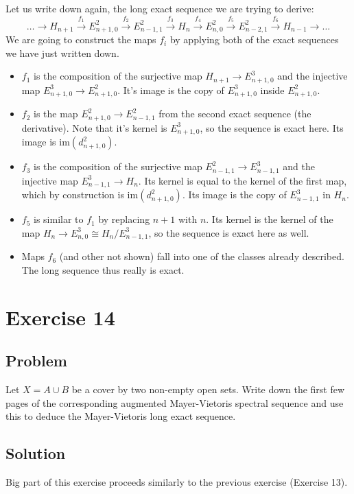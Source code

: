 \documentclass{article}
\begin{document}
Let us write down again, the long exact sequence we are trying to derive:
\begin{equation*}
\dots \to H_{n+1} \xrightarrow{f_1} E^2_{n+1,0} \xrightarrow{f_2}  E^2_{n-1,1} \xrightarrow{f_3}  H_n \xrightarrow{f_4}  E^2_{n,0} \xrightarrow{f_5}  E^2_{n-2,1} \xrightarrow{f_6}  H_{n-1} \to \dots
\end{equation*}
We are going to construct the maps $f_i$ by applying both of the exact sequences we have just written down.
\begin{itemize}
\item $f_1$ is the composition of the surjective map $H_{n+1} \to E_{n+1,0}^3$ and the injective map $E^3_{n+1,0} \to E^2_{n+1,0}$. It's image is the copy of $E^3_{n+1,0}$ inside $E^2_{n+1,0}$.
\item $f_2$ is the map $E^2_{n+1,0} \to E^2_{n-1,1}$ from the second exact sequence (the derivative). Note that it's kernel is $E^3_{n+1,0}$, so the sequence is exact here. Its image is $\mathrm{im}(d^2_{n+1,0})$.
\item $f_3$ is the composition of the surjective map $E^2_{n-1,1} \to E^3_{n-1,1}$ and the injective map $E^3_{n-1,1} \to H_n$. Its kernel is equal to the kernel of the first map, which by construction is $\mathrm{im}(d^2_{n+1,0})$. Its image is the copy of $E^3_{n-1,1}$ in $H_n$.
\item $f_5$ is similar to $f_1$ by replacing $n+1$ with $n$. Its kernel is the kernel of the map $H_n \to E_{n,0}^3 \cong H_n/E^3_{n-1,1}$, so the sequence is exact here as well.
\item Maps $f_6$ (and other not shown) fall into one of the classes already described. The long sequence thus really is exact. 
\end{itemize}
\newpage
\section*{Exercise 14}
\subsection*{Problem}
Let $X = A \cup B$ be a cover by two non-empty open sets. Write down the first few pages of the
corresponding augmented Mayer-Vietoris spectral sequence and use this to deduce the Mayer-Vietoris long exact sequence. 
\subsection*{Solution}
Big part of this exercise proceeds similarly to the previous exercise (Exercise 13).
\end{document}
